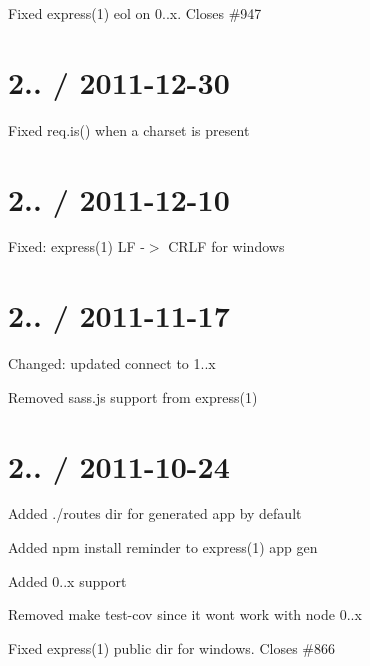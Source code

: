 \begin{DoxyItemize}
\item Fixed {\ttfamily express(1)} eol on 0..\+x. Closes \#947
\end{DoxyItemize}

\section*{2.. / 2011-\/12-\/30 }


\begin{DoxyItemize}
\item Fixed {\ttfamily req.\+is()} when a charset is present
\end{DoxyItemize}

\section*{2.. / 2011-\/12-\/10 }


\begin{DoxyItemize}
\item Fixed\+: express(1) L\+F -\/$>$ C\+R\+L\+F for windows
\end{DoxyItemize}

\section*{2.. / 2011-\/11-\/17 }


\begin{DoxyItemize}
\item Changed\+: updated connect to 1..\+x
\item Removed sass.\+js support from express(1)
\end{DoxyItemize}

\section*{2.. / 2011-\/10-\/24 }


\begin{DoxyItemize}
\item Added ./routes dir for generated app by default
\item Added npm install reminder to express(1) app gen
\item Added 0..\+x support
\item Removed {\ttfamily make test-\/cov} since it wont work with node 0..\+x
\item Fixed express(1) public dir for windows. Closes \#866
\end{DoxyItemize}

